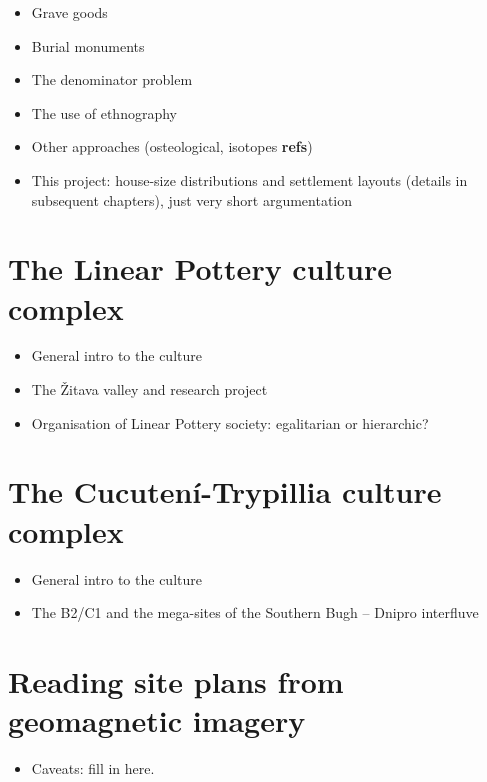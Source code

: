 \documentclass[
  12pt,
]{book}
\providecommand{\tightlist}{%
  \setlength{\itemsep}{0pt}\setlength{\parskip}{0pt}}
\begin{document}
\begin{itemize}
\item
  Grave goods
\item
  Burial monuments
\item
  The denominator problem
\item
  The use of ethnography
\item
  Other approaches (osteological, isotopes \textbf{refs})
\item
  This project: house-size distributions and settlement layouts (details in subsequent chapters), just very short argumentation
\end{itemize}

\hypertarget{the-linear-pottery-culture-complex}{%
\section{The Linear Pottery culture complex}\label{the-linear-pottery-culture-complex}}

\begin{itemize}
\item
  General intro to the culture
\item
  The Žitava valley and research project
\item
  Organisation of Linear Pottery society: egalitarian or hierarchic?
\end{itemize}

\hypertarget{the-cucutenuxed-trypillia-culture-complex}{%
\section{The Cucutení-Trypillia culture complex}\label{the-cucutenuxed-trypillia-culture-complex}}

\begin{itemize}
\item
  General intro to the culture
\item
  The B2/C1 and the mega-sites of the Southern Bugh -- Dnipro interfluve
\end{itemize}

\hypertarget{reading-site-plans-from-geomagnetic-imagery}{%
\section{Reading site plans from geomagnetic imagery}\label{reading-site-plans-from-geomagnetic-imagery}}

\begin{itemize}
\tightlist
\item
  Caveats: fill in here.
\end{itemize}
\end{document}
